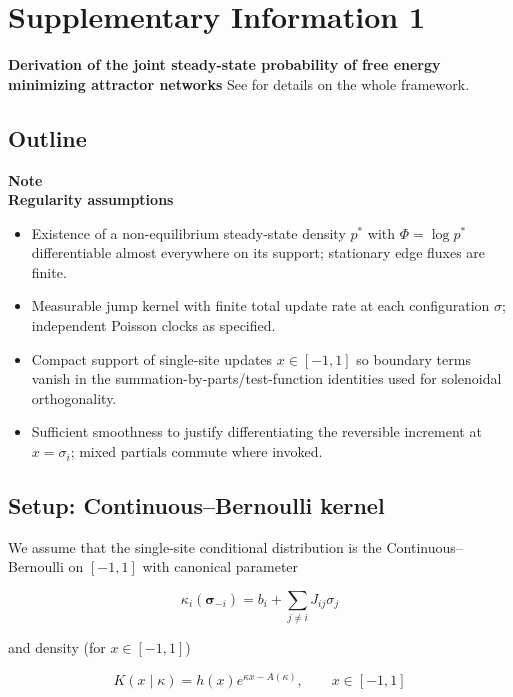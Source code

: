 \documentclass{article}
\begin{document}
\section{Supplementary Information 1}

\textbf{Derivation of the joint steady-state probability of free energy minimizing attractor networks}
See \citep{https://doi.org/10.48550/arxiv.2505.22749} for details on the whole framework.

\subsection{Outline}

\begin{framed}
\textbf{Note}\\
\textbf{Regularity assumptions}

\begin{itemize}
\item Existence of a non-equilibrium steady-state density $p^\ast$ with $\Phi=\log p^\ast$ differentiable almost everywhere on its support; stationary edge fluxes are finite.
\item Measurable jump kernel with finite total update rate at each configuration $\sigma$; independent Poisson clocks as specified.
\item Compact support of single-site updates $x\in[ -1,1]$ so boundary terms vanish in the summation-by-parts/test-function identities used for solenoidal orthogonality.
\item Sufficient smoothness to justify differentiating the reversible increment at $x=\sigma_i$; mixed partials commute where invoked.
\end{itemize}
\end{framed}

\subsection{Setup: Continuous--Bernoulli kernel}

We assume that the single-site conditional distribution is the Continuous--Bernoulli on $[ -1,1]$ with canonical parameter

\begin{equation}
\kappa_i(\boldsymbol{\sigma}_{-i}) = b_i + \sum_{j\neq i} J_{ij}\sigma_j
\end{equation}

and density (for $x\in[ -1,1]$)

\begin{equation}
K(x\mid \kappa) = h(x) e^{\kappa x - A(\kappa)}, \qquad x\in[-1,1]
\end{equation}
\end{document}
